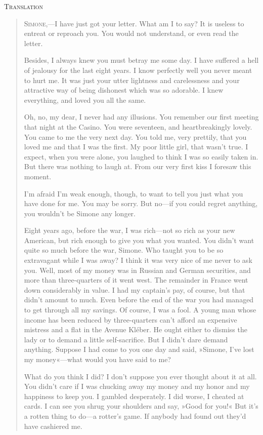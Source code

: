\textsc{Translation}

\begin{quotation}
\textsc{Simone},---I have just got your letter. What am I to say? It is
useless to entreat or reproach you. You would not understand, or even
read the letter.

Besides, I always knew you must betray me some day. I have suffered
a hell of jealousy for the last eight years. I know perfectly well
you never meant to hurt me. It was just your utter lightness and
carelessness and your attractive way of being dishonest which was so
adorable. I knew everything, and loved you all the same.

Oh, no, my dear, I never had any illusions. You remember our
first meeting that night at the Casino. You were seventeen, and
heartbreakingly lovely. You came to me the very next day. You told me,
very prettily, that you loved me and that I was the first. My poor
little girl, that wasn't true. I expect, when you were alone, you
laughed to think I was so easily taken in. But there was nothing to
laugh at. From our very first kiss I foresaw this moment.

I'm afraid I'm weak enough, though, to want to tell you just what
you have done for me. You may be sorry. But no\allowbreak---\allowbreak if you could regret
anything, you wouldn't be Simone any longer.

Eight years ago, before the war, I was rich\allowbreak---\allowbreak not so rich as your new
American, but rich enough to give you what you wanted. You didn't
want quite so much before the war, Simone. Who taught you to be so
extravagant while I was away? I think it was very nice of me never to
ask you. Well, most of my money was in Russian and German securities,
and more than three-quarters of it went west. The remainder in France
went down considerably in value. I had my captain's pay, of course,
but that didn't amount to much. Even before the end of the war you
had managed to get through all my savings. Of course, I was a fool. A
young man whose income has been reduced by three-quarters can't afford
an expensive mistress and a flat in the Avenue Kléber. He ought either
to dismiss the lady or to demand a little self-sacrifice. But I didn't
dare demand anything. Suppose I had come to you one day and said,
»Simone, I've lost my money«---what would you have said to me?

What do you think I did? I don't suppose you ever thought about it
at all. You didn't care if I was chucking away my money and my honor
and my happiness to keep you. I gambled desperately. I did worse, I
cheated at cards. I can see you shrug your shoulders and say, »Good
for you!« But it's a rotten thing to do\allowbreak---\allowbreak a rotter's game. If anybody
had found out they'd have cashiered me.


\end{quotation}
